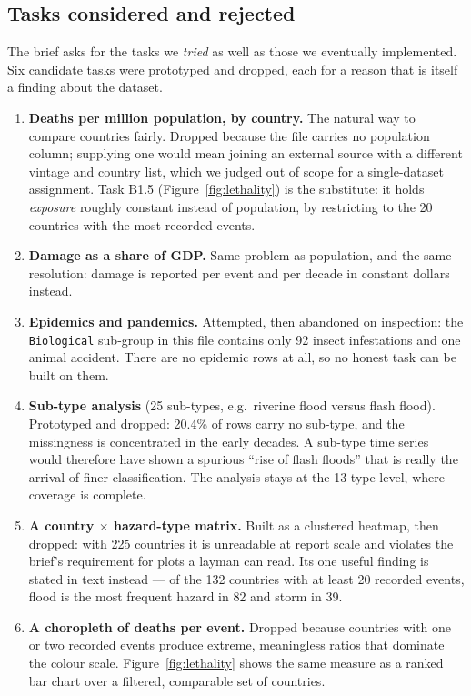 \documentclass[11pt,a4paper]{article}
\begin{document}
\subsection{Tasks considered and rejected}
\label{sec:rejected}

The brief asks for the tasks we \emph{tried} as well as those we eventually
implemented. Six candidate tasks were prototyped and dropped, each for a reason
that is itself a finding about the dataset.

\begin{enumerate}
\item \textbf{Deaths per million population, by country.} The natural way to
  compare countries fairly. Dropped because the file carries no population
  column; supplying one would mean joining an external source with a different
  vintage and country list, which we judged out of scope for a single-dataset
  assignment. Task B1.5 (Figure~\ref{fig:lethality}) is the substitute: it holds
  \emph{exposure} roughly constant instead of population, by restricting to the
  20 countries with the most recorded events.
\item \textbf{Damage as a share of GDP.} Same problem as population, and the same
  resolution: damage is reported per event and per decade in constant dollars
  instead.
\item \textbf{Epidemics and pandemics.} Attempted, then abandoned on inspection:
  the \texttt{Biological} sub-group in this file contains only 92 insect
  infestations and one animal accident. There are no epidemic rows at all, so no
  honest task can be built on them.
\item \textbf{Sub-type analysis} (25 sub-types, e.g.\ riverine flood versus flash
  flood). Prototyped and dropped: 20.4\% of rows carry no sub-type, and the
  missingness is concentrated in the early decades. A sub-type time series would
  therefore have shown a spurious ``rise of flash floods'' that is really the
  arrival of finer classification. The analysis stays at the 13-type level, where
  coverage is complete.
\item \textbf{A country $\times$ hazard-type matrix.} Built as a clustered
  heatmap, then dropped: with 225 countries it is unreadable at report scale and
  violates the brief's requirement for plots a layman can read. Its one useful
  finding is stated in text instead --- of the 132 countries with at least 20
  recorded events, flood is the most frequent hazard in 82 and storm in 39.
\item \textbf{A choropleth of deaths per event.} Dropped because countries with
  one or two recorded events produce extreme, meaningless ratios that dominate
  the colour scale. Figure~\ref{fig:lethality} shows the same measure as a ranked
  bar chart over a filtered, comparable set of countries.
\end{enumerate}
\end{document}

